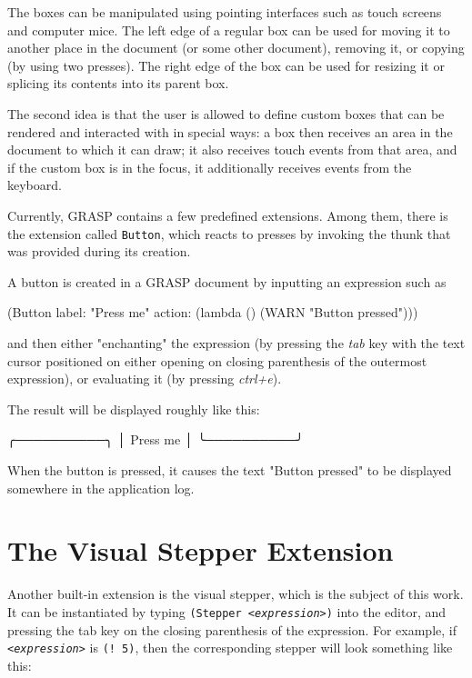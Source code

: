 \documentclass[acmsmall]{acmart}
\newenvironment{Snippet}{\Verbatim[samepage=true]}{\endVerbatim}
\begin{document}
The boxes can be manipulated using pointing interfaces such as touch
screens and computer mice. The left edge of a regular box can be used for
moving it to another place in the document (or some other document),
removing it, or copying (by using two presses). The right edge
of the box can be used for resizing it or splicing its contents
into its parent box.

The second idea is that the user is allowed to define custom boxes
that can be rendered and interacted with in special ways: a box then
receives an area in the document to which it can draw; it also
receives touch events from that area, and if the custom box is in the
focus, it additionally receives events from the keyboard.

Currently, GRASP contains a few predefined extensions. Among them,
there is the extension called \texttt{Button}, which reacts to presses by
invoking the thunk that was provided during its creation.

A button is created in a GRASP document by inputting an expression
such as

\begin{Snippet}
(Button label: "Press me" 
	action: (lambda () (WARN "Button pressed")))
\end{Snippet}

and then either "enchanting" the expression (by pressing the
\textit{tab} key with the text cursor positioned on either opening
on closing parenthesis of the outermost expression),
or evaluating it (by pressing \textit{ctrl+e}).

The result will be displayed roughly like this:

\begin{Snippet}
╭──────────╮
│ Press me │
╰──────────╯
\end{Snippet}

When the button is pressed, it causes the text "Button pressed" to be
displayed somewhere in the application log.

\section{The Visual Stepper Extension}


Another built-in extension is the visual stepper, which is the subject
of this work. It can be instantiated by typing \texttt{(Stepper
  \textit{<expression>})} into the editor, and pressing the tab key on
the closing parenthesis of the expression. For example, if
\texttt{\textit{<expression>}} is \texttt{(! 5)}, then the
corresponding stepper will look something like this:
\end{document}
